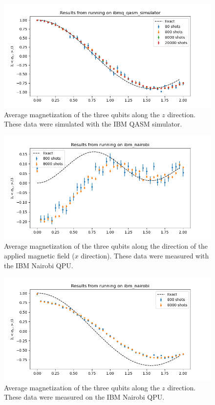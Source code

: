 \documentclass{article}
\begin{document}
\begin{figure}[!htb]
    \centering
        \includegraphics[width=5in]{sigma_z_ibmq_qasm_simulator.png}
        \caption{Average magnetization of the three qubits along the $z$ direction. These data were simulated with the IBM QASM simulator.}
        \label{ibmq_qasm.sigma_z}
\end{figure}


\begin{figure}[!htb]
    \centering
        \includegraphics[width=5in]{sigma_x_ibm_nairobi.png}
        \caption{Average magnetization of the three qubits along the direction of the applied magnetic field ($x$ direction). These data were measured with the IBM Nairobi QPU.}
        \label{ibm_nairobi.sigma_x}
\end{figure}

\begin{figure}[!htb]
    \centering
        \includegraphics[width=5in]{sigma_z_ibm_nairobi.png}
        \caption{Average magnetization of the three qubits along the  $z$ direction. These data were measured on the IBM Nairobi QPU.}
        \label{ibm_nairobi.sigma_z}
\end{figure}
\end{document}
